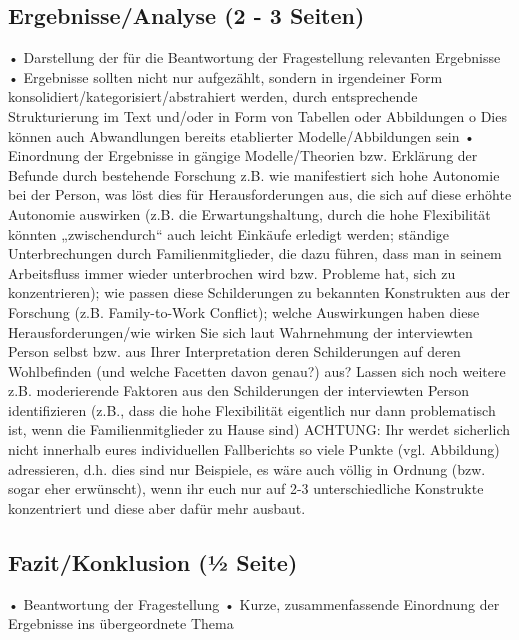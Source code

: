 \documentclass[man]{apa7}
\begin{document}
\subsection{Ergebnisse/Analyse (2 - 3 Seiten)}
• Darstellung der für die Beantwortung der Fragestellung relevanten Ergebnisse
• Ergebnisse sollten nicht nur aufgezählt, sondern in irgendeiner Form
konsolidiert/kategorisiert/abstrahiert werden, durch entsprechende Strukturierung im Text und/oder in Form von Tabellen oder Abbildungen
o Dies können auch Abwandlungen bereits etablierter Modelle/Abbildungen sein
• Einordnung der Ergebnisse in gängige Modelle/Theorien bzw. Erklärung der Befunde durch
bestehende Forschung
z.B. wie manifestiert sich hohe Autonomie bei der Person, was löst dies für Herausforderungen aus, die sich auf diese erhöhte Autonomie auswirken (z.B. die Erwartungshaltung, durch die hohe Flexibilität könnten „zwischendurch“ auch leicht Einkäufe erledigt werden; ständige Unterbrechungen durch Familienmitglieder, die dazu führen, dass man in seinem Arbeitsfluss immer wieder unterbrochen wird bzw. Probleme hat, sich zu konzentrieren); wie passen diese Schilderungen zu bekannten Konstrukten aus der Forschung (z.B. Family-to-Work Conflict); welche Auswirkungen haben diese Herausforderungen/wie wirken Sie sich laut Wahrnehmung der interviewten Person selbst bzw. aus Ihrer Interpretation deren Schilderungen auf deren Wohlbefinden (und welche Facetten davon genau?) aus? Lassen sich noch weitere z.B. moderierende Faktoren aus den Schilderungen der interviewten Person identifizieren (z.B., dass die hohe Flexibilität eigentlich nur dann problematisch ist, wenn die Familienmitglieder zu Hause sind)
ACHTUNG: Ihr werdet sicherlich nicht innerhalb eures individuellen Fallberichts so viele Punkte (vgl. Abbildung) adressieren, d.h. dies sind nur Beispiele, es wäre auch völlig in Ordnung (bzw. sogar eher erwünscht), wenn ihr euch nur auf 2-3 unterschiedliche Konstrukte konzentriert und diese aber dafür mehr ausbaut.

\subsection{Fazit/Konklusion (1⁄2 Seite)}
• Beantwortung der Fragestellung
• Kurze, zusammenfassende Einordnung der Ergebnisse ins übergeordnete Thema

\printbibliography

\appendix
\end{document}
